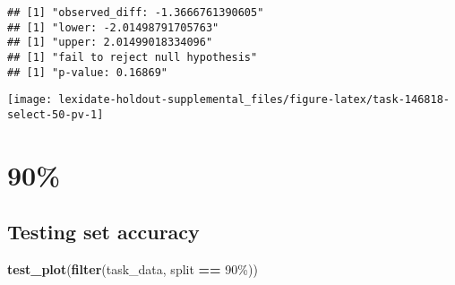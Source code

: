\documentclass[
]{book}
\newenvironment{Shaded}{\begin{snugshade}}{\end{snugshade}}
\newcommand{\AttributeTok}[1]{\textcolor[rgb]{0.13,0.29,0.53}{#1}}
\newcommand{\DecValTok}[1]{\textcolor[rgb]{0.00,0.00,0.81}{#1}}
\newcommand{\FunctionTok}[1]{\textcolor[rgb]{0.13,0.29,0.53}{\textbf{#1}}}
\newcommand{\NormalTok}[1]{#1}
\newcommand{\OtherTok}[1]{\textcolor[rgb]{0.56,0.35,0.01}{#1}}
\newcommand{\SpecialCharTok}[1]{\textcolor[rgb]{0.81,0.36,0.00}{\textbf{#1}}}
\newcommand{\StringTok}[1]{\textcolor[rgb]{0.31,0.60,0.02}{#1}}
\begin{document}
\begin{Shaded}
\end{Shaded}

\begin{verbatim}
## [1] "observed_diff: -1.3666761390605"
## [1] "lower: -2.01498791705763"
## [1] "upper: 2.01499018334096"
## [1] "fail to reject null hypothesis"
## [1] "p-value: 0.16869"
\end{verbatim}

\texttt{[image: lexidate-holdout-supplemental\_files/figure-latex/task-146818-select-50-pv-1]}

\hypertarget{section-3}{%
\section{90\%}\label{section-3}}

\hypertarget{testing-set-accuracy-3}{%
\subsection{Testing set accuracy}\label{testing-set-accuracy-3}}

\begin{Shaded}
\begin{Highlighting}[]
\FunctionTok{test\_plot}\NormalTok{(}\FunctionTok{filter}\NormalTok{(task\_data, split }\SpecialCharTok{==} \StringTok{\textquotesingle{}90\%\textquotesingle{}}\NormalTok{))}
\end{Highlighting}
\end{Shaded}
\end{document}
